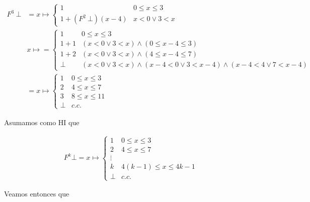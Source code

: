 \documentclass[a4paper, 12pt]{article}
\begin{document}
\begin{align*}
  F^3 ~ \bot 
  &=x\mapsto 
  \begin{cases}
    1 & 0 \leq x \leq 3 \\ 
    1 + (F^2 ~ \bot ) (x-4) & x < 0 \lor  3 < x
  \end{cases} \\ 
  &x\mapsto =\begin{cases}
    1 & 0 \leq x \leq 3 \\ 
    1 + 1 & (x < 0 \lor 3 < x) \land (0 \leq x -4 \leq 3) \\ 
    1 + 2 & (x < 0 \lor  3 < x) \land (4 \leq x - 4 \leq 7) \\ 
    \bot & (x < 0 \lor 3 < x) \land (x - 4 < 0 \lor  3 < x - 4) \land  (x - 4 <
    4 \lor  7 < x - 4)
  \end{cases} \\ 
  &=x\mapsto \begin{cases}
    1 & 0 \leq x \leq 3 \\ 
    2 & 4 \leq x \leq 7 \\ 
    3 & 8 \leq x \leq 11 \\ 
    \bot & c.c.
  \end{cases}
\end{align*}

Asumamos como HI que

\begin{align*}
  F^{k} \bot = x\mapsto \begin{cases}
    1 & 0 \leq x \leq 3 \\ 
    2 & 4 \leq x \leq 7 \\ 
    \vdots \\ 
    k & 4(k-1) \leq x \leq 4k - 1 \\ 
    \bot & c.c.
  \end{cases}
\end{align*}

Veamos entonces que 
\end{document}
